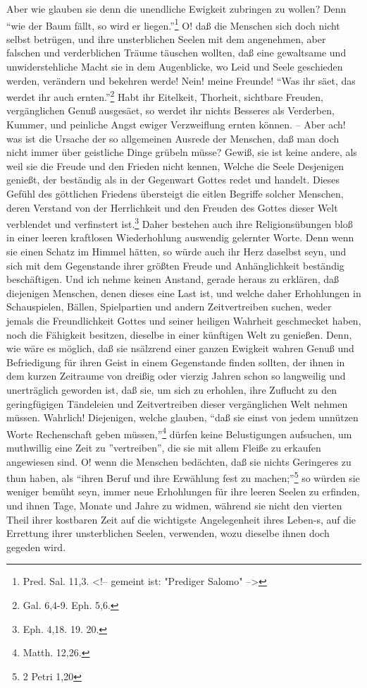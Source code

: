 Aber wie glauben sie denn die unendliche Ewigkeit zubringen zu wollen? Denn
"`wie der Baum fällt, so wird er liegen."'\footnote{Pred. Sal. 11,3. <!--
gemeint ist: "Prediger Salomo" -->} O! daß die Menschen sich doch nicht selbst
betrügen, und ihre unsterblichen Seelen mit dem angenehmen, aber falschen und
verderblichen Träume täuschen wollten, daß eine gewaltsame und unwiderstehliche
Macht sie in dem Augenblicke, wo Leid und Seele geschieden werden, verändern und
bekehren werde! Nein! meine Freunde! "`Was ihr säet, das werdet ihr auch
ernten."'\footnote{Gal. 6,4-9. Eph. 5,6.} Habt ihr Eitelkeit, Thorheit,
sichtbare Freuden, vergänglichen Genuß ausgesäet, so werdet ihr nichts Besseres
als Verderben, Kummer, und peinliche Angst ewiger Verzweiflung ernten können. --
Aber ach! was ist die Ursache der so allgemeinen Ausrede der Menschen, daß man
doch nicht immer über geistliche Dinge grübeln müsse? Gewiß, sie ist keine
andere, als weil sie die Freude und den Frieden nicht kennen, Welche die Seele
Desjenigen genießt, der beständig als in der Gegenwart Gottes redet und handelt.
Dieses Gefühl des göttlichen Friedens übersteigt die eitlen Begriffe solcher
Menschen, deren Verstand von der Herrlichkeit und den Freuden des Gottes dieser
Welt verblendet und verfinstert ist.\footnote{Eph. 4,18. 19. 20.} Daher bestehen
auch ihre Religionsübungen bloß in einer leeren kraftlosen Wiederhohlung
auswendig gelernter Worte. Denn wenn sie einen Schatz im Himmel hätten, so würde
auch ihr Herz daselbst seyn, und sich mit dem Gegenstande ihrer größten Freude
und Anhänglichkeit beständig beschäftigen. Und ich nehme keinen Anstand, gerade
heraus zu erklären, daß diejenigen Menschen, denen dieses eine Last ist, und
welche daher Erhohlungen in Schauspielen, Bällen, Spielpartien und andern
Zeitvertreiben suchen, weder jemals die Freundlichkeit Gottes und seiner
heiligen Wahrheit geschmecket haben, noch die Fähigkeit besitzen, dieselbe in
einer künftigen Welt zu genießen. Denn, wie wäre es möglich, daß sie nsälzrend
einer ganzen Ewigkeit wahren Genuß und Befriedigung für ihren Geist in einem
Gegenstande finden sollten, der ihnen in dem kurzen Zeitraume von dreißig oder
vierzig Jahren schon so langweilig und unerträglich geworden ist, daß sie, um
sich zu erhohlen, ihre Zuflucht zu den geringfügigen Tändeleien und
Zeitvertreiben dieser vergänglichen Welt nehmen müssen. Wahrlich! Diejenigen,
welche glauben,  "`daß sie einst von jedem unnützen Worte Rechenschaft geben
müssen,"'\footnote{Matth. 12,26.} dürfen keine Belustigungen aufsuchen, um
muthwillig eine Zeit zu ''vertreiben'', die sie mit allem Fleiße zu erkaufen
angewiesen sind. O! wenn die Menschen bedächten, daß sie nichts Geringeres zu
thun haben, als "`ihren Beruf und ihre Erwählung fest zu machen;"'\footnote{2
Petri 1,20} so würden sie weniger bemüht seyn, immer neue Erhohlungen für ihre
leeren Seelen zu erfinden, und ihnen Tage, Monate und Jahre zu widmen, während
sie nicht den vierten Theil ihrer kostbaren Zeit auf die wichtigste
Angelegenheit ihres Leben-s, auf die Errettung ihrer unsterblichen Seelen,
verwenden, wozu dieselbe ihnen doch gegeden wird.

